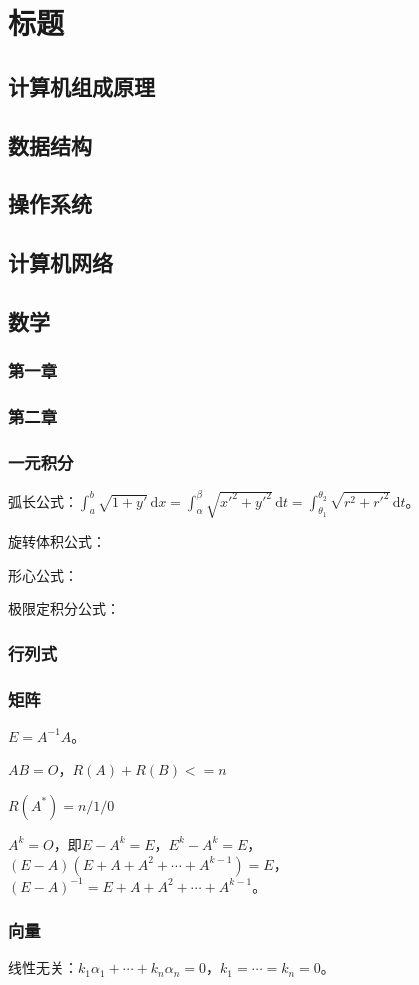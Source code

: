 \setcounter{tocdepth}{4}
\setcounter{secnumdepth}{4}
\renewcommand{\baselinestretch}{1.5}
\chapter{标题}
\section{计算机组成原理}
\section{数据结构}
\section{操作系统}
\section{计算机网络}
\section{数学}
\subsection{第一章}
\subsection{第二章}
\subsection{一元积分}

弧长公式：$\int_a^b\sqrt{1+y'}\,\textrm{d}x=\int_\alpha^\beta\sqrt{x'^2+y'^2}\,\textrm{d}t=\int_{\theta_1}^{\theta_2}\sqrt{r^2+r'^2}\,\textrm{d}t$。

旋转体积公式：

形心公式：

极限定积分公式：

\subsection{行列式}
\subsection{矩阵}

$E=A^{-1}A$。

$AB=O$，$R(A)+R(B)<=n$

$R(A^*)=n/1/0$

$A^k=O$，即$E-A^k=E$，$E^k-A^k=E$，$(E-A)(E+A+A^2+\cdots+A^{k-1})=E$，$(E-A)^{-1}=E+A+A^2+\cdots+A^{k-1}$。
\subsection{向量}

线性无关：$k_1\alpha_1+\cdots+k_n\alpha_n=0$，$k_1=\cdots=k_n=0$。
%